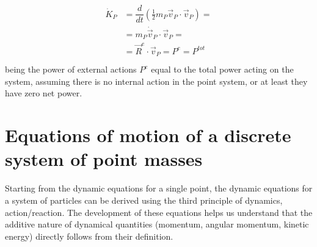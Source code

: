 \documentclass[letterpaper,10pt,english]{jupyterBook}
\begin{document}
\begin{equation*}
\begin{split}\begin{aligned}
\dot{K}_{P} & = \dfrac{d}{dt} \left( \frac{1}{2} m_P \vec{v}_P \cdot \vec{v}_P \right) = \\
            & = m_P \dot{\vec{v}}_P \cdot \vec{v}_P = \\
            & = \vec{R}^e \cdot \vec{v}_P = P^e = P^{tot} \\
\end{aligned}\end{split}
\end{equation*}
\sphinxAtStartPar
being the power of external actions \(P^e\) equal to the total power acting on the system, assuming there is no internal action in the point system, or at least they have zero net power.

\sphinxstepscope


\section{Equations of motion of a discrete system of point masses}
\label{\detokenize{ch/dynamics-eom-points:equations-of-motion-of-a-discrete-system-of-point-masses}}\label{\detokenize{ch/dynamics-eom-points:classical-mechanics-dynamics-eom-points}}\label{\detokenize{ch/dynamics-eom-points::doc}}
\sphinxAtStartPar
Starting from the dynamic equations for a single point, the dynamic equations for a system of particles can be derived using the third principle of dynamics, action/reaction. The development of these equations helps us understand that the additive nature of dynamical quantities (momentum, angular momentum, kinetic energy) directly follows from their definition.
\end{document}
